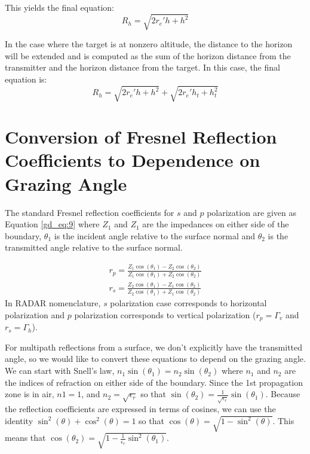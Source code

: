 \noindent This yields the final equation:
\begin{equation}
\label{gd_eq:8}
\boxed{R_h = \sqrt{2r_e'h + h^2}}
\end{equation}
\renewcommand{\baselinestretch}{2} \small\normalsize

In the case where the target is at nonzero altitude, the distance to the horizon will be extended and is computed as the sum of the horizon distance from the transmitter and the horizon distance from the target. In this case, the final equation is:
\begin{equation}
\label{gd_eq:8a}
\boxed{R_h = \sqrt{2r_e'h + h^2} + \sqrt{2r_e'h_t + h_t^2}}
\end{equation}
\renewcommand{\baselinestretch}{2} \small\normalsize

\section{Conversion of Fresnel Reflection Coefficients to Dependence on Grazing Angle}
The standard Fresnel reflection coefficients for $s$ and $p$ polarization are given as Equation \ref{gd_eq:9} \cite{zangwill_modern_em} where $Z_1$ and $Z_1$ are the impedances on either side of the boundary, $\theta_1$ is the incident angle relative to the surface normal and $\theta_2$ is the transmitted angle relative to the surface normal.

\begin{equation}
\begin{gathered}
\label{gd_eq:9}
r_p = \frac{Z_1\cos(\theta_1) - Z_2\cos(\theta_2)}{Z_1\cos(\theta_1) + Z_2\cos(\theta_2)} \\
r_s = \frac{Z_2\cos(\theta_1) - Z_1\cos(\theta_2)}{Z_2\cos(\theta_1) + Z_1\cos(\theta_2)}
\end{gathered}
\end{equation}
\renewcommand{\baselinestretch}{2} \small\normalsize
In RADAR nomenclature, $s$ polarization case corresponds to horizontal polarization and $p$ polarization corresponds to vertical polarization ($r_p = \Gamma_v$ and $r_s = \Gamma_h$).

For multipath reflections from a surface, we don't explicitly have the transmitted angle, so we would like to convert these equations to depend on the grazing angle. We can start with Snell's law, $n_1\sin(\theta_1) = n_2\sin(\theta_2)$ where $n_1$ and $n_2$ are the indices of refraction on either side of the boundary. Since the 1st propagation zone is in air, $n1 = 1$, and $n_2 = \sqrt{\epsilon_r}$ so that $\sin(\theta_2) = \frac{1}{\sqrt{\epsilon_r}}\sin(\theta_1)$. Because the reflection coefficients are expressed in terms of cosines, we can use the identity $\sin^2(\theta) + \cos^2(\theta) = 1$ so that $\cos(\theta) = \sqrt{1 - \sin^2(\theta)}$. This means that $\cos(\theta_2) = \sqrt{1 - \frac{1}{\epsilon_r}\sin^2(\theta_1)}$.

